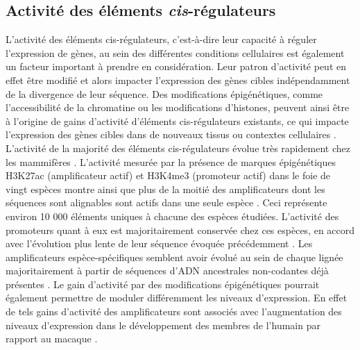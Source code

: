 \subsection{Activité des éléments \textit{cis}-régulateurs}
\label{subsec:evol-seq-enh}

L’activité des éléments \gls{cis}-régulateurs, c’est-à-dire leur capacité à réguler l’expression de gènes, au sein des différentes \glspl{condition} cellulaires est également un facteur important à prendre en considération. Leur patron d’activité peut en effet être modifié et alors impacter l’expression des gènes cibles indépendamment de la divergence de leur séquence. Des modifications épigénétiques, comme l’accessibilité de la chromatine ou les modifications d’histones, peuvent ainsi être à l’origine de gains d’activité d’éléments \gls{cis}-régulateurs existants, ce qui impacte l’expression des gènes cibles dans de nouveaux tissus ou contextes cellulaires \citep{rebeiz_evolutionary_2011, xin_enhancer_2020}. \\

L’activité de la majorité des éléments \gls{cis}-régulateurs évolue très rapidement chez les mammifères \citep{xiao_comparative_2012, cotney_evolution_2013, villar_enhancer_2015}. L’activité mesurée par la présence de marques épigénétiques H3K27ac (\gls{amplificateur} actif) et H3K4me3 (promoteur actif) dans le foie de vingt espèces montre ainsi que plus de la moitié des \glspl{amplificateur} dont les séquences sont alignables sont actifs dans une seule espèce \citep{villar_enhancer_2015}. Ceci représente environ 10 000 éléments uniques à chacune des espèces étudiées. L’activité des promoteurs quant à eux est majoritairement conservée chez ces espèces, en accord avec l’évolution plus lente de leur séquence évoquée précédemment \citep{cheng_principles_2014}. Les \glspl{amplificateur} espèce-spécifiques semblent avoir évolué au sein de chaque lignée majoritairement à partir de séquences d’ADN ancestrales non-codantes déjà présentes \citep{villar_enhancer_2015}. Le gain d’activité par des modifications épigénétiques pourrait également permettre de moduler différemment les niveaux d’expression. En effet de tels gains d’activité des \glspl{amplificateur} sont associés avec l’augmentation des niveaux d’expression dans le développement des membres de l’humain par rapport au macaque \citep{cotney_evolution_2013}. \\

